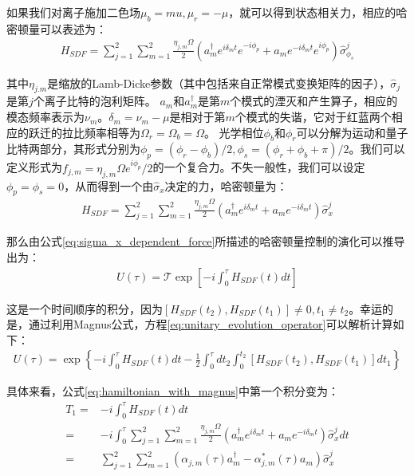 如果我们对离子施加二色场$\mu_b=mu, \mu_r=-\mu$，就可以得到状态相关力，相应的哈密顿量可以表述为：
\begin{align}
    H_{SDF}=\sum_{j=1}^{2}\sum_{m=1}^{2}\frac{\eta_{j,m}\Omega}{2}\left(a_m^\dagger e^{i\delta_m t}e^{-i\phi_p}+a_m e^{-i\delta_m t}e^{i\phi_p}\right)\hat{\sigma}_{\phi_s}^j
\end{align}

其中$\eta_{j.m}$是缩放的Lamb-Dicke参数（其中包括来自正常模式变换矩阵的因子）\cite[]{James_1998}，$\hat{\sigma}_j$是第$j$个离子比特的泡利矩阵。
$a_m$和$a_m^\dagger$是第$m$个模式的湮灭和产生算子，相应的模态频率表示为$\nu_m$。$\delta_m=\nu_m-\mu$是相对于第$m$个模式的失谐，它对于红蓝两个相应的跃迁的拉比频率相等为$\Omega_r=\Omega_b=\Omega$。
光学相位$\phi_b$和$\phi_r$可以分解为运动和量子比特两部分，其形式分别为$\phi_p=(\phi_r-\phi_b)/2, \phi_s=(\phi_r+\phi_b+\pi)/2$。我们可以定义形式为$f_{j,m}=\eta_{j,m}\Omega e^{i\phi_p}/2$的一个复合力。不失一般性，我们可以设定$\phi_p=\phi_s=0$，从而得到一个由$\hat{\sigma}_x$决定的力，哈密顿量为：
\begin{align}
    H_{SDF}=\sum_{j=1}^{2}\sum_{m=1}^{2}\frac{\eta_{j, m}\Omega}{2}\left(a_m^\dagger e^{i\delta_mt}+a_m e^{-i\delta_mt}\right)\hat{\sigma}_x^j\label{eq:sigma_x_dependent_force}
\end{align}

那么由公式\eqref{eq:sigma_x_dependent_force}所描述的哈密顿量控制的演化可以推导出为：
\begin{align}
    U(\tau)=\mathscr{T}\exp\left[-i\int_{0}^{\tau}H_{SDF}(t)dt\right]\label{eq:unitary_evolution_operator}
\end{align}

这是一个时间顺序的积分，因为$[H_{SDF}(t_2),H_{SDF}(t_1)]\neq 0, t_1\neq t_2$。幸运的是，通过利用Magnus公式，方程\eqref{eq:unitary_evolution_operator}可以解析计算如下\cite[]{Lee_Brickman_Deslauriers_Haljan_Duan_Monroe_2005}：
\begin{align}
    U(\tau)=\exp\left\{-i\int_{0}^{\tau}H_{SDF}(t)dt-\frac{1}{2}\int_{0}^{\tau}dt_2\int_{0}^{t_2}[H_{SDF}(t_2),H_{SDF}(t_1)]dt_1\right\}\label{eq:hamiltonian_with_magnus}
\end{align}

具体来看，公式\eqref{eq:hamiltonian_with_magnus}中第一个积分变为：
\begin{align}
    T_1=&-i\int_{0}^{\tau}H_{SDF}(t)dt\\
    =&-i\int_{0}^{\tau}\sum_{j=1}^{2}\sum_{m=1}^{2}\frac{\eta_{j,m}\Omega}{2}\left(a_m^\dagger e^{i\delta_mt}+a_m e^{-i\delta_mt}\right)\hat{\sigma}_x^j dt\\
    =&\sum_{j=1}^{2}\sum_{m=1}^{2}\left(\alpha_{j,m}(\tau)a_m^\dagger-\alpha_{j,m}^*(\tau)a_m\right)\hat{\sigma}_x^j\label{eq:integral_t1}
\end{align}

